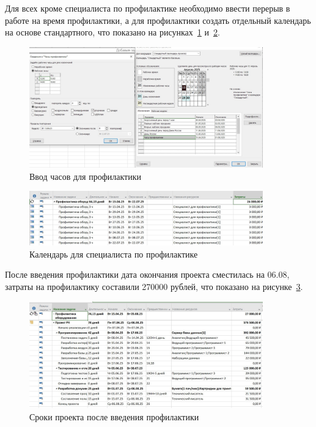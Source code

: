Для всех кроме специалиста по профилактике необходимо ввести перерыв в работе на время профилактики, а для профилактики создать отдельный календарь на основе стандартного, что показано на рисунках~\ref{fig:screen8_5} и~\ref{fig:screen8_6}.

\begin{figure}[H]
	\centering
	\includegraphics[width=0.9\textwidth]{img/task8/screen8_5.jpg}
	\caption{Ввод часов для профилактики}
	\label{fig:screen8_5}
\end{figure}

\begin{figure}[H]
	\centering
	\includegraphics[width=0.9\textwidth]{img/task8/screen8_4.jpg}
	\caption{Календарь для специалиста по профилактике}
	\label{fig:screen8_6}
\end{figure}

После введения профилактики дата окончания проекта сместилась на 06.08, затраты на профилактику составили 270000 рублей, что показано на рисунке~\ref{fig:screen8_7}.

\begin{figure}[H]
	\centering
	\includegraphics[width=0.9\textwidth]{img/task8/screen8_7.jpg}
	\caption{Сроки проекта после введения профилактики}
	\label{fig:screen8_7}
\end{figure}

